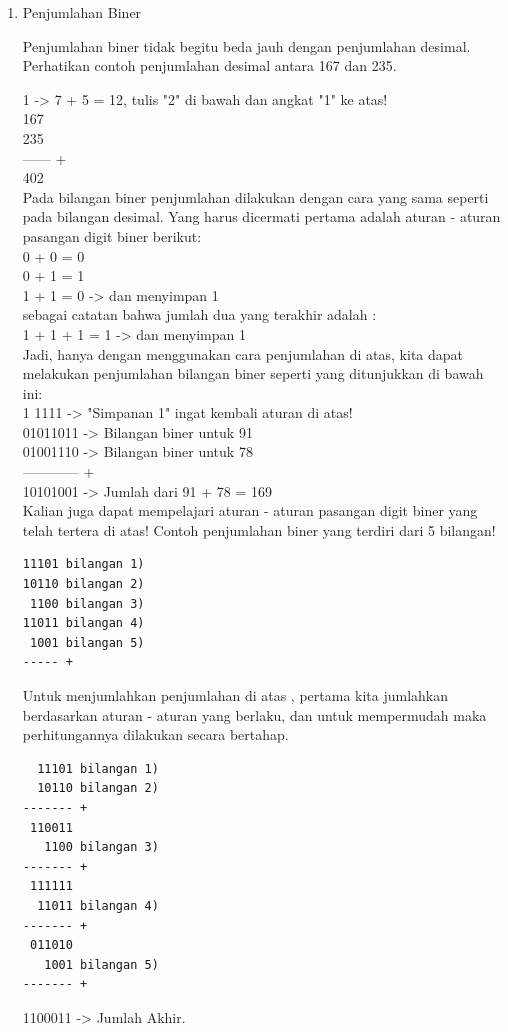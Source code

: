 \begin{enumerate}[label=(\alph*)]
\begin{enumerate}

\item Penjumlahan Biner

\qquad Penjumlahan biner tidak begitu beda jauh dengan penjumlahan desimal. Perhatikan contoh penjumlahan desimal antara 167 dan 235.

1 -> 7 + 5 = 12, tulis "2" di bawah dan angkat "1" ke atas! \\

167 \\
235 \\
------ + \\
402 \\

\qquad Pada bilangan biner penjumlahan dilakukan dengan cara yang sama seperti pada bilangan desimal. Yang harus dicermati pertama adalah aturan - aturan pasangan digit biner berikut:\\
0 + 0 = 0 \\
0 + 1 = 1 \\
1 + 1 = 0 -> dan menyimpan 1 \\

sebagai catatan bahwa jumlah dua yang terakhir adalah : \\
1 + 1 + 1 = 1 -> dan menyimpan 1 \\

\qquad Jadi, hanya dengan menggunakan cara penjumlahan di atas, kita dapat melakukan penjumlahan bilangan biner seperti yang ditunjukkan di bawah ini: \\
1 1111 -> "Simpanan 1" ingat kembali aturan di atas! \\
01011011 -> Bilangan biner untuk 91 \\
01001110 -> Bilangan biner untuk 78 \\
------------ + \\
10101001 -> Jumlah dari 91 + 78 = 169 \\

\qquad Kalian juga dapat mempelajari aturan - aturan pasangan digit biner yang telah tertera di atas! Contoh penjumlahan biner yang terdiri dari 5 bilangan!\\
\begin{verbatim}
11101 bilangan 1)
10110 bilangan 2) 
 1100 bilangan 3)
11011 bilangan 4)
 1001 bilangan 5)
----- +
\end{verbatim}

\qquad Untuk menjumlahkan penjumlahan di atas , pertama kita jumlahkan berdasarkan aturan - aturan yang berlaku, dan untuk mempermudah maka perhitungannya dilakukan secara bertahap. \\
\begin{verbatim}
  11101 bilangan 1)
  10110 bilangan 2)
------- +
 110011
   1100 bilangan 3)
------- +
 111111
  11011 bilangan 4)
------- +
 011010
   1001 bilangan 5)
------- +
\end{verbatim}
1100011 -> Jumlah Akhir. \\


\end{enumerate}
\end{enumerate}
